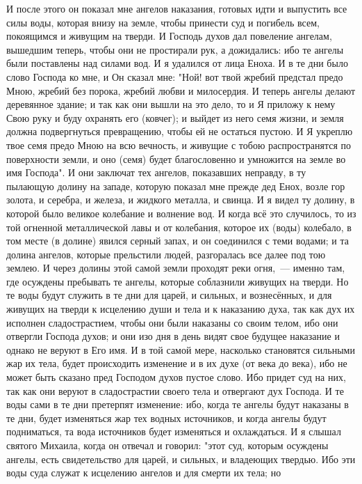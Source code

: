 И после этого он показал мне ангелов наказания, готовых идти и
выпустить все силы воды, которая внизу на земле, чтобы принести суд и погибель
всем, покоящимся и живущим на тверди.
И Господь духов дал повеление ангелам, вышедшим теперь, чтобы они не
простирали рук, а дожидались: ибо те ангелы были поставлены над силами вод.
И я удалился от лица Еноха.
И в те дни было слово Господа ко мне, и Он сказал мне: "Ной!
вот твой жребий предстал предо Мною, жребий без порока, жребий любви
и милосердия.
И теперь ангелы делают деревянное здание; и так как они вышли на это
дело, то и Я приложу к нему Свою руку и буду охранять его (ковчег); и выйдет из
него семя жизни, и земля должна подвергнуться превращению, чтобы ей не остаться
пустою.
И Я укреплю твое семя предо Мною на всю вечность, и живущие с тобою
распространятся по поверхности земли, и оно (семя) будет благословенно и
умножится на земле во имя Господа".
И они заключат тех ангелов, показавших неправду, в ту пылающую долину
на западе, которую показал мне прежде дед Енох, возле гор золота, и серебра, и
железа, и жидкого металла, и свинца.
И я видел ту долину, в которой было великое колебание и волнение вод.
И когда всё это случилось, то из той огненной металлической лавы и от
колебания, которое их (воды) колебало, в том месте (в долине) явился серный
запах, и он соединился с теми водами; и та долина ангелов, которые прельстили
людей, разгоралась все далее под тою землею.
И через долины этой самой земли проходят реки огня,~--- именно там, где
осуждены пребывать те ангелы, которые соблазнили живущих на тверди.
Но те воды будут служить в те дни для царей, и сильных, и вознесённых,
и для живущих на тверди к исцелению души и тела и к наказанию духа, так как
дух их исполнен сладострастием, чтобы они были наказаны со своим телом, ибо
они отвергли Господа духов; и они изо дня в день видят свое будущее наказание и
однако не веруют в Его имя.
И в той самой мере, насколько становятся сильными жар их тела, будет
происходить изменение и в их духе (от века до века), ибо не может быть сказано
пред Господом духов пустое слово.
Ибо придет суд на них, так как они веруют в сладострастии своего тела
и отвергают дух Господа.
И те воды сами в те дни претерпят изменение: ибо, когда те ангелы
будут наказаны в те дни, будет изменяться жар тех водных источников, и когда
ангелы будут подниматься, та вода источников будет изменяться и охлаждаться.
И я слышал святого Михаила, когда он отвечал и говорил: "этот суд,
которым осуждены ангелы, есть свидетельство для царей, и сильных, и владеющих
твердью.
Ибо эти воды суда служат к исцелению ангелов и для смерти их тела; но
